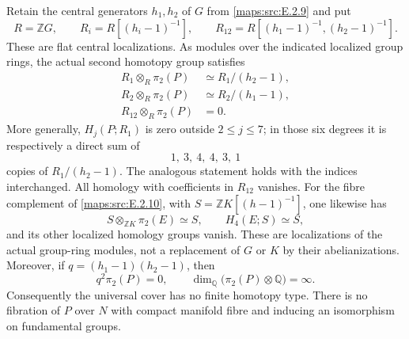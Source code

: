 \begin{theorem}\label{maps:src:E.2.12}


Retain the central generators $h_1,h_2$ of $G$ from \ref{maps:src:E.2.9} and put
\[
 R=\mathbb ZG,\qquad R_i=R[(h_i-1)^{-1}],\qquad
              R_{12}=R[(h_1-1)^{-1},(h_2-1)^{-1}].
 \tag{E.S13}\label{maps:eq:E.S13}
\]
These are flat central localizations. As modules over the indicated
localized group rings, the actual second homotopy group satisfies
\[
 \begin{split}
 R_1\otimes_R\pi_2(P)&\simeq R_1/(h_2-1),\\
 R_2\otimes_R\pi_2(P)&\simeq R_2/(h_1-1),\\
 R_{12}\otimes_R\pi_2(P)&=0.
 \end{split}
 \tag{E.S14}\label{maps:eq:E.S14}
\]
More generally, $H_j(P;R_1)$ is zero outside $2\leq j\leq7$;
in those six degrees it is respectively a direct sum of
\[
                  1,\ 3,\ 4,\ 4,\ 3,\ 1
 \tag{E.S15}\label{maps:eq:E.S15}
\]
copies of $R_1/(h_2-1)$. The analogous statement holds with the
indices interchanged. All homology with coefficients in $R_{12}$
vanishes. For the fibre complement of \ref{maps:src:E.2.10}, with
$S=\mathbb ZK[(h-1)^{-1}]$, one likewise has
\[
             S\otimes_{\mathbb ZK}\pi_2(E)\simeq S,
       \qquad H_4(E;S)\simeq S,
 \tag{E.S16}\label{maps:eq:E.S16}
\]
and its other localized homology groups vanish. These are
localizations of the actual group-ring modules, not a replacement
of $G$ or $K$ by their abelianizations. Moreover, if
$q=(h_1-1)(h_2-1)$, then
\[
                  q^2\pi_2(P)=0,
        \qquad \dim_{\mathbb Q}\bigl(\pi_2(P)\otimes\mathbb Q\bigr)
                     =\infty.
 \tag{E.S20}\label{maps:eq:E.S20}
\]
Consequently the universal cover has no finite homotopy type.
There is no fibration of $P$ over $N$ with compact manifold fibre
and inducing an isomorphism on fundamental groups.

\end{theorem}



